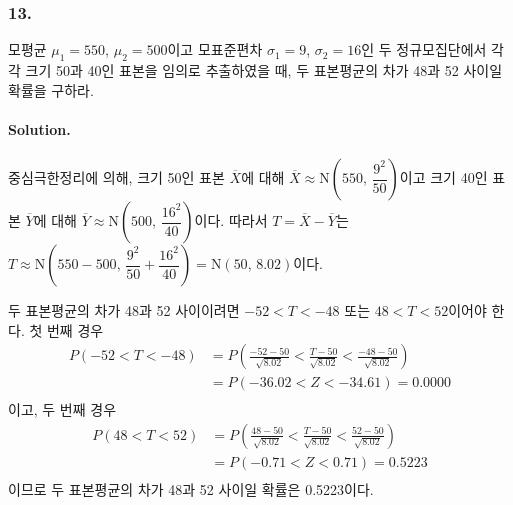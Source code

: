 \subsubsection{13.} 모평균 $\mu_1=550$, $\mu_2=500$이고 모표준편차 $\sigma_1=9$, $\sigma_2=16$인 두 정규모집단에서
각각 크기 50과 40인 표본을 임의로 추출하였을 때, 두 표본평균의 차가 48과 52 사이일 확률을 구하라.

\paragraph{Solution.} 중심극한정리에 의해, 크기 50인 표본 $\overline{X}$에 대해 $\overline{X} \approx \mathrm{N}\left(550,\,\dfrac{9^2}{50}\right)$이고
크기 40인 표본 $\overline{Y}$에 대해 $\overline{Y} \approx \mathrm{N}\left(500,\,\dfrac{16^2}{40}\right)$이다. 따라서 $T=\overline{X}-\overline{Y}$는
$T\approx \mathrm{N}\left(550-500,\,\dfrac{9^2}{50}+\dfrac{16^2}{40}\right)=\mathrm{N}\left(50,\,8.02\right)$이다.

두 표본평균의 차가 48과 52 사이이려면 $-52<T<-48$ 또는 $48<T<52$이어야 한다. 첫 번째 경우
\begin{align*}
    P\left(-52<T<-48\right) &= P\left(\frac{-52-50}{\sqrt{8.02}}<\frac{T-50}{\sqrt{8.02}}<\frac{-48-50}{\sqrt{8.02}}\right) \\ 
    &= P\left(-36.02<Z<-34.61\right) = 0.0000 \\
\end{align*}
이고, 두 번째 경우
\begin{align*}
    P\left(48<T<52\right) &= P\left(\frac{48-50}{\sqrt{8.02}}<\frac{T-50}{\sqrt{8.02}}<\frac{52-50}{\sqrt{8.02}}\right) \\ 
    &= P\left(-0.71<Z<0.71\right) = 0.5223 \\
\end{align*}
이므로 두 표본평균의 차가 48과 52 사이일 확률은 0.5223이다.